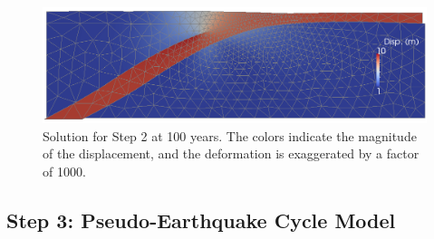 \noindent \begin{center}
\begin{figure}
\begin{centering}
\includegraphics[width=4.5in]{tutorials/subduction/figs/step02_soln}
\par\end{centering}

\caption{Solution for Step 2 at 100 years. The colors indicate the magnitude
of the displacement, and the deformation is exaggerated by a factor
of 1000.\label{fig:tutorial:subduction:step02}}
\end{figure}

\par\end{center}


\subsection{Step 3: Pseudo-Earthquake Cycle Model}

